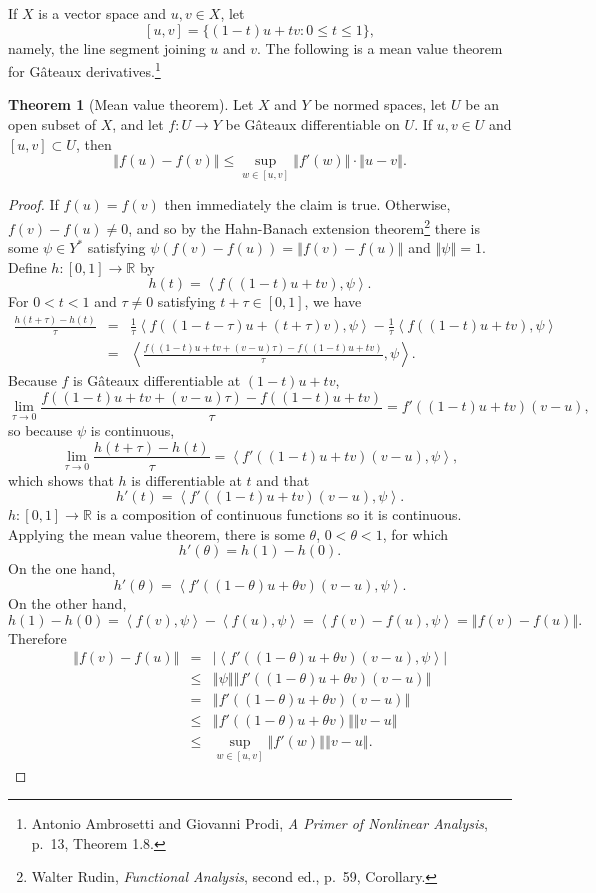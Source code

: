 \documentclass{article}
\newcommand{\inner}[2]{\left\langle #1, #2 \right\rangle}
\newcommand{\norm}[1]{\left\Vert #1 \right\Vert}
\theoremstyle{definition}
\newtheorem{theorem}{Theorem}
\theoremstyle{definition}
\begin{document}
If $X$ is a vector space and $u,v \in X$, let
\[
[u,v] = \{(1-t)u+tv: 0 \leq t \leq 1\},
\]
namely, the line segment joining $u$ and $v$. 
The following is a mean value theorem for G\^ateaux derivatives.\footnote{Antonio Ambrosetti and
Giovanni Prodi, {\em A Primer of Nonlinear Analysis}, p.~13, Theorem 1.8.}

\begin{theorem}[Mean value theorem]
Let $X$ and $Y$  be  normed spaces, let $U$ be an open subset of $X$, and let $f:U \to Y$ be G\^ateaux differentiable on
$U$. If $u,v \in U$ and $[u,v] \subset U$, then
\[
\norm{f(u)-f(v)} \leq \sup_{w \in [u,v]} \norm{f'(w)} \cdot \norm{u-v}.
\]
\label{MVT}
\end{theorem}
\begin{proof}
If $f(u)=f(v)$ then immediately the claim is true. Otherwise, $f(v)-f(u) \neq 0$, and so by the Hahn-Banach extension theorem\footnote{Walter
Rudin, {\em Functional Analysis}, second ed., p.~59, Corollary.} there
is some $\psi \in Y^*$ satisfying $\psi(f(v)-f(u)) = \norm{f(v)-f(u)}$ and $\norm{\psi}=1$. 
Define $h:[0,1] \to \mathbb{R}$ by
\[
h(t)=\inner{f((1-t)u+tv)}{\psi}.
\]
For $0<t<1$ and $\tau \neq 0$ satisfying $t+\tau \in [0,1]$, we have
\begin{eqnarray*}
\frac{h(t+\tau)-h(t)}{\tau}&=&\frac{1}{\tau}\inner{f((1-t-\tau)u+(t+\tau)v)}{\psi}-\frac{1}{\tau}\inner{f((1-t)u+tv)}{\psi}\\
&=&\inner{\frac{f((1-t)u+tv+(v-u)\tau)-f((1-t)u+tv)}{\tau}}{\psi}.
\end{eqnarray*}
Because $f$ is G\^ateaux differentiable at $(1-t)u+tv$, 
\[
\lim_{\tau \to 0} \frac{f((1-t)u+tv+(v-u)\tau)-f((1-t)u+tv)}{\tau} = f'((1-t)u+tv)(v-u),
\]
so because $\psi$ is continuous,
\[
\lim_{\tau \to 0} \frac{h(t+\tau)-h(t)}{\tau} = \inner{f'((1-t)u+tv)(v-u)}{\psi},
\]
which shows that $h$ is differentiable at $t$ and that
\[
h'(t)=\inner{f'((1-t)u+tv)(v-u)}{\psi}.
\]
$h:[0,1] \to \mathbb{R}$ is a composition of continuous functions so it is continuous. Applying the mean value theorem, there is some
$\theta$, $0<\theta<1$, for which
\[
h'(\theta)=h(1)-h(0).
\]
On the one hand,
\[
h'(\theta)=\inner{f'((1-\theta)u+\theta v)(v-u)}{\psi}.
\]
On the other hand,
\[
h(1)-h(0)=\inner{f(v)}{\psi}-\inner{f(u)}{\psi}=\inner{f(v)-f(u)}{\psi}=\norm{f(v)-f(u)}.
\]
Therefore
\begin{eqnarray*}
\norm{f(v)-f(u)} &=& |\inner{f'((1-\theta)u+\theta v)(v-u)}{\psi}|\\
&\leq& \norm{\psi} \norm{f'((1-\theta)u+\theta v)(v-u)}\\
&=&\norm{f'((1-\theta)u+\theta v)(v-u)}\\
&\leq&\norm{f'((1-\theta)u+\theta v)}\norm{v-u}\\
&\leq&\sup_{w \in [u,v]} \norm{f'(w)} \norm{v-u}.
\end{eqnarray*}
\end{proof}
\end{document}
